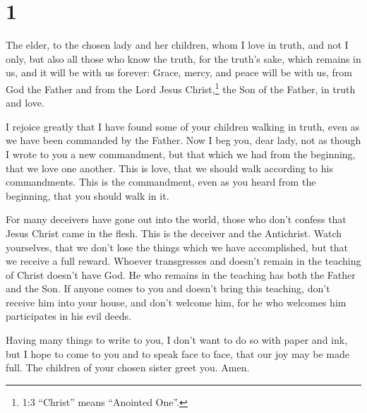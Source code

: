 \hypertarget{section}{%
\section{1}\label{section}}

 The elder, to the chosen lady and her children, whom I love
in truth, and not I only, but also all those who know the truth,
 for the truth's sake, which remains in us, and it will be
with us forever:  Grace, mercy, and peace will be with us,
from God the Father and from the Lord Jesus Christ,\footnote{1:3
  ``Christ'' means ``Anointed One''.} the Son of the Father, in truth
and love.

 I rejoice greatly that I have found some of your children
walking in truth, even as we have been commanded by the Father.
 Now I beg you, dear lady, not as though I wrote to you a
new commandment, but that which we had from the beginning, that we love
one another.  This is love, that we should walk according to
his commandments. This is the commandment, even as you heard from the
beginning, that you should walk in it.

 For many deceivers have gone out into the world, those who
don't confess that Jesus Christ came in the flesh. This is the deceiver
and the Antichrist.  Watch yourselves, that we don't lose
the things which we have accomplished, but that we receive a full
reward.  Whoever transgresses and doesn't remain in the
teaching of Christ doesn't have God. He who remains in the teaching has
both the Father and the Son.  If anyone comes to you and
doesn't bring this teaching, don't receive him into your house, and
don't welcome him,  for he who welcomes him participates in
his evil deeds.

 Having many things to write to you, I don't want to do so
with paper and ink, but I hope to come to you and to speak face to face,
that our joy may be made full.  The children of your chosen
sister greet you. Amen.
